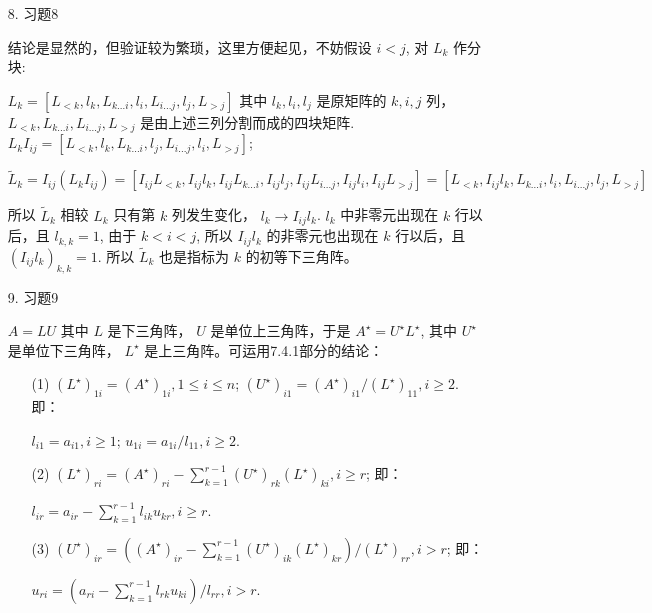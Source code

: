 \documentclass{article}
\begin{document}
\begin{itemize}
\begin{spacing}{1.5}
    \end{spacing}

    \item [8.] 习题8
    
    结论是显然的，但验证较为繁琐，这里方便起见，不妨假设 $i < j$, 对 $L_k$ 作分块:

    $L_k = \left[L_{<k}, l_k, L_{k...i}, l_{i}, L_{i...j}, l_{j}, L_{>j}\right]$
    其中 $l_k, l_i, l_j$ 是原矩阵的 $k,i,j$ 列，$L_{<k}, L_{k...i}, L_{i...j}, L_{>j}$ 是由上述三列分割而成的四块矩阵. $L_k I_{ij} = \left[L_{<k}, l_k, L_{k...i}, l_{j}, L_{i...j}, l_{i}, L_{>j}\right]$; 
    
    $\widetilde{L}_k = I_{ij}(L_kI_{ij}) = \left[I_{ij}L_{<k}, I_{ij}l_k, I_{ij}L_{k...i}, I_{ij}l_{j}, I_{ij}L_{i...j}, I_{ij}l_{i}, I_{ij}L_{>j}\right] = [L_{<k}, I_{ij}l_k, L_{k...i}, l_i, L_{i...j}, l_j, L_{>j}]$

    所以 $\widetilde{L}_k$ 相较 $L_k$ 只有第 $k$ 列发生变化， $l_k \to I_{ij}l_{k}$. $l_k$ 中非零元出现在 $k$ 行以后，且 $l_{k,k} = 1$, 由于 $k <i < j$, 所以 $I_{ij}l_{k}$ 的非零元也出现在 $k$ 行以后，且 $(I_{ij}l_{k})_{k, k} = 1$. 所以 $\widetilde{L}_k$ 也是指标为 $k$ 的初等下三角阵。

    \item [9.] 习题9
    \begin{spacing}{1.5}
    
    $A = LU$ 其中 $L$ 是下三角阵， $U$ 是单位上三角阵，于是 $A^\star = U^\star L^\star$, 其中 $U^\star$ 是单位下三角阵， $L^\star$ 是上三角阵。可运用7.4.1部分的结论：
    \begin{itemize}
        \item [(1)] $(L^\star)_{1i} = (A^\star)_{1i}, 1\leq i \leq n$; $(U^\star)_{i1} = (A^\star)_{i1} / (L^\star)_{11}, i \geq 2$. 即：
        
        $l_{i1} = a_{i1}, i\geq 1$; $u_{1i} = a_{1i} / l_{11}, i\geq 2$.
        \item [(2)] $(L^\star)_{ri} = (A^\star)_{ri} - \sum_{k=1}^{r-1} (U^\star)_{rk}(L^\star)_{ki}, i\geq r$; 即：
        
        $l_{ir} = a_{ir} - \sum_{k = 1}^{r - 1} l_{ik}u_{kr}, i\geq r$.

        \item [(3)] $(U^\star)_{ir} = ((A^\star)_{ir} - \sum_{k=1}^{r-1}(U^\star)_{ik}(L^\star)_{kr}) / (L^\star)_{rr}, i > r$; 即：
        
        $u_{ri} = (a_{ri} - \sum_{k=1}^{r-1} l_{rk}u_{ki}) / l_{rr}, i > r$.
    \end{itemize}


\end{spacing}
\end{itemize}
\end{document}
